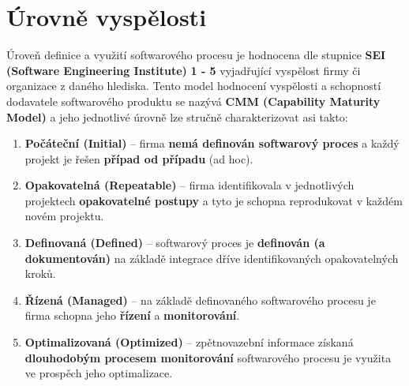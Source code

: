 \section{Úrovně vyspělosti}
Úroveň definice a využití softwarového procesu je hodnocena dle stupnice \textbf{SEI (Software Engineering Institute)} \textbf{1 - 5} vyjadřující vyspělost firmy či organizace z daného hlediska. Tento model hodnocení vyspělosti a schopností dodavatele softwarového produktu se nazývá \textbf{CMM (Capability Maturity Model)} a jeho jednotlivé úrovně lze stručně charakterizovat asi takto:

\begin{enumerate}
    \item \textbf{Počáteční (Initial)} -- firma \textbf{nemá definován softwarový proces} a každý projekt je řešen \textbf{případ od případu} (ad hoc).
    \item \textbf{Opakovatelná (Repeatable)} -- firma identifikovala v jednotlivých projektech \textbf{opakovatelné postupy} a tyto je schopna reprodukovat v každém novém projektu.
    \item \textbf{Definovaná (Defined)} -- softwarový proces je \textbf{definován (a dokumentován)} na základě integrace dříve identifikovaných opakovatelných kroků.
    \item \textbf{Řízená (Managed)} -- na základě definovaného softwarového procesu je firma schopna jeho \textbf{řízení} a \textbf{monitorování}.
    \item \textbf{Optimalizovaná (Optimized)} -- zpětnovazební informace získaná \textbf{dlouhodobým procesem monitorování} softwarového procesu je využita ve prospěch jeho optimalizace.
\end{enumerate}

